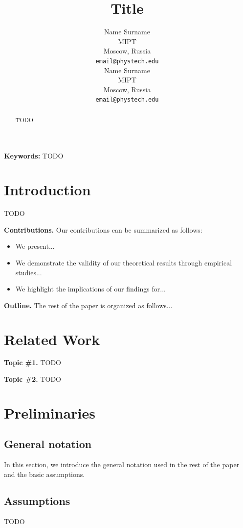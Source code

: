 \documentclass{article}
\title{Title}
\author{
  Name Surname\\
  MIPT\\
  Moscow, Russia\\
  \texttt{email@phystech.edu}\\
  \And
  Name Surname\\
  MIPT\\
  Moscow, Russia\\
  \texttt{email@phystech.edu}\\
}
\begin{document}
\maketitle

\begin{abstract}
    TODO
\end{abstract}

\textbf{Keywords:} TODO

\section{Introduction}\label{sec:intro}

TODO

\textbf{Contributions.} Our contributions can be summarized as follows:
\begin{itemize}
    \item We present...
    \item We demonstrate the validity of our theoretical results through empirical studies...
    \item We highlight the implications of our findings for...
\end{itemize}

\textbf{Outline.} The rest of the paper is organized as follows...

\section{Related Work}\label{sec:rw}

\textbf{Topic \#1.}
TODO

\textbf{Topic \#2.}
TODO

\section{Preliminaries}\label{sec:prelim}

\subsection{General notation}

In this section, we introduce the general notation used in the rest of the paper and the basic assumptions. 

\subsection{Assumptions} 

TODO
\end{document}
